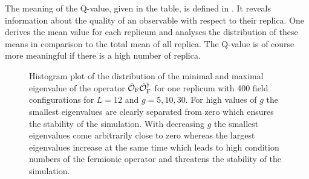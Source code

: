 %
%
%

%
%
%
The meaning of the Q-value, given in the table, is defined in \cite{Wolff:2003sm}. It reveals information about the quality of an observable with respect to their replica. One derives the mean value for each replicum and analyses the distribution of these means in comparison to the total mean of all replica. The Q-value is of course more meaningful if there is a high number of replica. \\
%
\begin{figure}
\centering

\hspace{0.2cm}

\caption{Histogram plot of the distribution of the minimal and maximal eigenvalue of the operator $\hat{\mathcal{O}}_{\rm F}\hat{\mathcal{O}}_{\rm F}^{\dagger}$ for one replicum with 400 field configurations for $L=12$ and $g=5,10,30$. For high values of $g$ the smallest eigenvalues are clearly separated from zero which ensures the stability of the simulation. With decreasing $g$ the smallest eigenvalues come arbitrarily close to zero whereas the largest eigenvalues increase at the same time which leads to high condition numbers of the fermionic operator and threatens the stability of the simulation. \label{fig: ev_dist}}
\end{figure}
%

